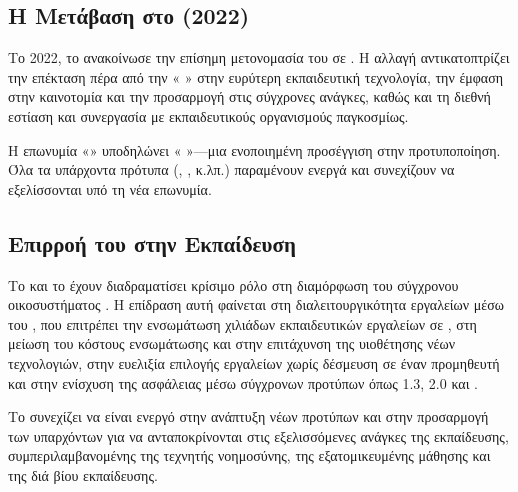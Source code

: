 \subsection{Η Μετάβαση στο  (2022)}
\label{subsec:1edtech_rebrand}

Το 2022, το   ανακοίνωσε την επίσημη μετονομασία του σε  . Η αλλαγή αντικατοπτρίζει την επέκταση πέρα από την « » στην ευρύτερη εκπαιδευτική τεχνολογία, την έμφαση στην καινοτομία και την προσαρμογή στις σύγχρονες ανάγκες, καθώς και τη διεθνή εστίαση και συνεργασία με εκπαιδευτικούς οργανισμούς παγκοσμίως.

Η επωνυμία «» υποδηλώνει «  »—μια ενοποιημένη προσέγγιση στην προτυποποίηση. Όλα τα υπάρχοντα πρότυπα (,  ,  κ.λπ.) παραμένουν ενεργά και συνεχίζουν να εξελίσσονται υπό τη νέα επωνυμία.

\subsection{Επιρροή του  στην Εκπαίδευση}

Το   και το  έχουν διαδραματίσει κρίσιμο ρόλο στη διαμόρφωση του σύγχρονου οικοσυστήματος . Η επίδραση αυτή φαίνεται στη διαλειτουργικότητα εργαλείων μέσω του , που επιτρέπει την ενσωμάτωση χιλιάδων εκπαιδευτικών εργαλείων σε , στη μείωση του κόστους ενσωμάτωσης και στην επιτάχυνση της υιοθέτησης νέων τεχνολογιών, στην ευελιξία επιλογής εργαλείων χωρίς δέσμευση σε έναν προμηθευτή και στην ενίσχυση της ασφάλειας μέσω σύγχρονων προτύπων όπως  1.3,  2.0 και  .

Το  συνεχίζει να είναι ενεργό στην ανάπτυξη νέων προτύπων και στην προσαρμογή των υπαρχόντων για να ανταποκρίνονται στις εξελισσόμενες ανάγκες της εκπαίδευσης, συμπεριλαμβανομένης της τεχνητής νοημοσύνης, της εξατομικευμένης μάθησης και της διά βίου εκπαίδευσης.


\begin{figure}[H]
  \centering
  
  \label{fig:lti_flow}
\end{figure}

